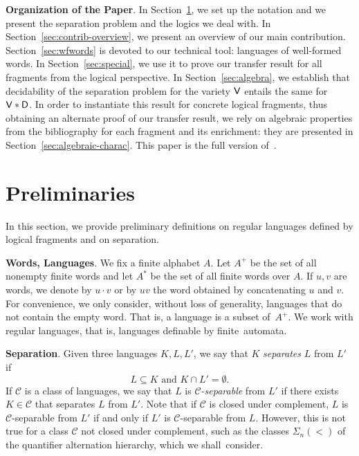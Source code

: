 \documentclass[a4paper,USenglish]{lipics}
\newcommand\Cs{\ensuremath{\mathcal{C}}\xspace}
\newcommand\Vbf{\ensuremath{{\sf V}}\xspace}
\newcommand\Dbf{\ensuremath{{\sf D}}\xspace}
\newcommand{\sio}[1]{\ensuremath{\Sigma_{#1}(<)}\xspace}
\newcommand\highlight[1]{\par\bigskip\noindent\textbf{\sffamily #1}.}
\theoremstyle{plain}
\begin{document}
\highlight{Organization of the Paper} In Section~\ref{sec:prelims}, we set up
the notation and we present the separation problem and the logics we deal
with. In Section~\ref{sec:contrib-overview}, we present an overview of our main
contribution. Section~\ref{sec:wfwords} is devoted to our technical tool:
languages of well-formed words. In Section~\ref{sec:special}, we use it to
prove our transfer result for all fragments from the logical perspective. In
Section~\ref{sec:algebra}, we establish that decidability of the separation
problem for the variety \Vbf entails the same for $\Vbf*\Dbf$. In order to
instantiate this result for concrete logical fragments, thus obtaining an
alternate proof of our transfer result, we rely on algebraic properties from
the bibliography for each fragment and its enrichment: they are presented in
Section~\ref{sec:algebraic-charac}.
This paper is the full version of~\cite{PZ:plusone-stacs}.

\section{Preliminaries}
\label{sec:prelims}
In this section, we provide preliminary definitions on regular
languages defined by logical fragments and on separation.

\highlight{Words, Languages} We fix a finite alphabet $A$. Let
$A^+$ be the set of all nonempty finite words and let $A^{*}$ be the set
of all finite words over $A$. If $u,v$ are words, we denote by $u \cdot v$ or by $uv$
the word obtained by concatenating $u$ and $v$. For convenience, we
only consider, without loss of generality, languages that do not contain the empty
word. That is, a language is a subset of~$A^+$. We work with regular languages,
that is, languages definable by finite~automata.

\highlight{Separation}
Given three languages $K,L,L'$, we say that $K$ \emph{separates}
$L$ from $L'$ if
\begin{equation*}
  L \subseteq K \text{ and } K \cap L' = \emptyset.
\end{equation*}
If \Cs is a class of languages, we say that $L$ is \emph{\Cs-separable} from
$L'$ if there exists $K \in \Cs$ that separates $L$ from $L'$. Note that if
\Cs is closed under complement, $L$ is \Cs-separable from $L'$ if and only if $L'$ is
\Cs-separable from $L$. However, this is not true for a class \Cs not closed
under complement, such as the classes $\sio n$ of the quantifier alternation
hierarchy, which we shall~consider.
\end{document}
